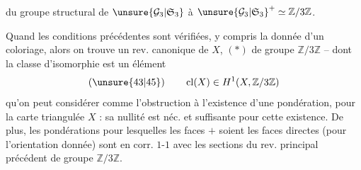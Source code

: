du groupe structural de $\unsure{\mathcal G_3|\mathfrak S_3}$ à $\unsure{\mathcal G_3|\mathfrak S_3}^+\simeq\mathbb Z/3\mathbb Z$.

Quand  les conditions précédentes sont vérifiées, y compris la donnée d'un  coloriage, alors on trouve un rev.  canonique   de $X$, $(*)$ de groupe $\mathbb Z/3\mathbb Z$ -- dont la classe d'isomorphie est un élément
\[
(\unsure{43|45})\qquad \operatorname{cl}(X)\in H^1(X,\mathbb Z/3\mathbb Z)
\]
qu'on peut considérer comme l'obstruction à l'existence d'une pondération, pour la carte triangulée $X$ : sa nullité est néc. et suffisante pour cette existence. De plus, les pondérations pour lesquelles les faces $+$ soient les faces directes (pour l'orientation donnée) sont en corr. $1$-$1$ avec les sections du  rev. principal précédent de groupe $\mathbb Z/3\mathbb Z$.
